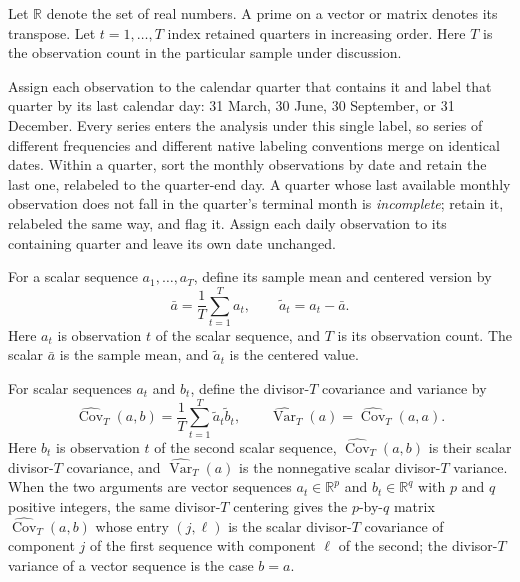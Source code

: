 \documentclass[11pt]{article}
\begin{document}
Let \(\mathbb R\) denote the set of real numbers. A prime on a vector or matrix denotes its
transpose. Let \(t=1,\ldots,T\) index retained quarters in increasing order. Here \(T\) is the
observation count in the particular sample under discussion.

Assign each observation to the calendar quarter that contains it and label that quarter by its last
calendar day: 31 March, 30 June, 30 September, or 31 December. Every series enters the analysis under
this single label, so series of different frequencies and different native labeling conventions
merge on identical dates. Within a quarter, sort the monthly observations by date and retain the last
one, relabeled to the quarter-end day. A quarter whose last available monthly observation does not
fall in the quarter's terminal month is \emph{incomplete}; retain it, relabeled the same way, and
flag it. Assign each daily observation to its containing quarter and leave its own date unchanged.

For a scalar sequence \(a_1,\ldots,a_T\), define its sample mean and centered version by
\begin{equation*}
 \bar a=\frac{1}{T}\sum_{t=1}^{T}a_t,
 \qquad \widetilde a_t=a_t-\bar a.
\end{equation*}
Here \(a_t\) is observation \(t\) of the scalar sequence, and \(T\) is its observation count.
The scalar \(\bar a\) is the sample mean, and \(\widetilde a_t\) is the centered value.

For scalar sequences \(a_t\) and \(b_t\), define the divisor-\(T\) covariance and variance by
\begin{equation}
 \widehat{\operatorname{Cov}}_T(a,b)
 =\frac{1}{T}\sum_{t=1}^{T}\widetilde a_t\widetilde b_t,
 \qquad
 \widehat{\operatorname{Var}}_T(a)
 =\widehat{\operatorname{Cov}}_T(a,a).
 \label{eq:covT}
\end{equation}
Here \(b_t\) is observation \(t\) of the second scalar sequence,
\(\widehat{\operatorname{Cov}}_T(a,b)\) is their scalar divisor-\(T\) covariance, and
\(\widehat{\operatorname{Var}}_T(a)\) is the nonnegative scalar divisor-\(T\) variance. When the two
arguments are vector sequences \(a_t\in\mathbb R^{p}\) and \(b_t\in\mathbb R^{q}\) with \(p\) and
\(q\) positive integers, the same divisor-\(T\) centering gives the \(p\)-by-\(q\) matrix
\(\widehat{\operatorname{Cov}}_T(a,b)\) whose entry \((j,\ell)\) is the scalar divisor-\(T\)
covariance of component \(j\) of the first sequence with component \(\ell\) of the second; the
divisor-\(T\) variance of a vector sequence is the case \(b=a\).
\end{document}
